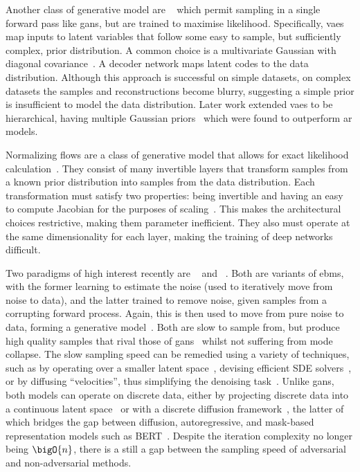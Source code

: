 Another class of generative model are ~\cite{kingma2013vae} which
permit sampling in a single forward pass like \glspl{gan}, but are trained to
maximise likelihood. Specifically, \glspl{vae} map inputs to latent variables
that follow some easy to sample, but sufficiently complex, prior distribution. A
common choice is a multivariate Gaussian with diagonal
covariance~\cite{kingma2013vae}. A decoder network maps latent codes to the data
distribution. Although this approach is successful on simple datasets, on
complex datasets the samples and reconstructions become blurry, suggesting a
simple prior is insufficient to model the data distribution. Later work extended
\glspl{vae} to be hierarchical, having multiple Gaussian
priors~\cite{arash2020nvae,child2020vqvae} which were found to outperform
\gls{ar} models.

Normalizing flows are a class of generative model that allows for exact
likelihood calculation~\cite{dinh2014nice,dinh2016density,kingma2018glow}. They
consist of many invertible layers that transform samples from a known
prior distribution into samples from the data distribution. Each transformation
must satisfy two properties: being invertible and having an easy to compute
Jacobian for the purposes of scaling~\cite{dinh2014nice,dinh2016density}. This
makes the architectural choices restrictive, making them parameter
inefficient. They also must operate at the same dimensionality for each
layer, making the training of deep networks difficult.

Two paradigms of high interest recently are
~\cite{ho2020ddpm,dhariwal2021ddpm} and
~\cite{song2019sbm,song2020sde,song2021mlt,vahdat2021sbmlatent}.
Both are variants of \glspl{ebm}, with the former learning to estimate the noise
(used to iteratively move from noise to data), and the latter trained to remove
noise, given samples from a corrupting forward process. Again, this is then used
to move from pure noise to data, forming a generative model~\cite{song2019sbm}.
Both are slow to sample from, but produce high quality samples that rival those
of \glspl{gan}~\cite{dhariwal2021ddpm} whilst not suffering from mode collapse.
The slow sampling speed can be remedied using a variety of techniques, such as
by operating over a smaller latent space~\cite{vahdat2021sbmlatent}, devising
efficient SDE solvers~\cite{martineau2021fast}, or by diffusing ``velocities'',
thus simplifying the denoising task~\cite{dockhorn2021langevin}. Unlike
\glspl{gan}, both models can operate on discrete data, either by projecting
discrete data into a continuous latent space~\cite{vahdat2021sbmlatent} or with
a discrete diffusion framework~\cite{austin2021structured}, the latter of which
bridges the gap between diffusion, autoregressive, and mask-based representation
models such as BERT~\cite{devlin2019bert}. Despite the iteration complexity no
longer being $\bigO{n}$, there is a still a gap between the sampling speed of
adversarial and non-adversarial methods.

